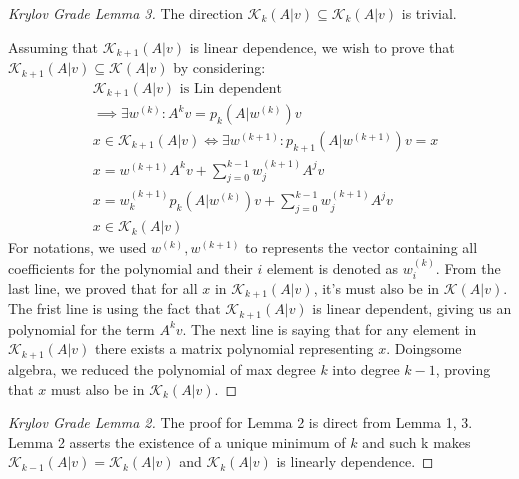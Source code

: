 \documentclass[]{article}
\theoremstyle{definition}
\begin{document}
            \begin{proof}[Krylov Grade Lemma 3]
                The direction $\mathcal K_k(A|v) \subseteq \mathcal K_k(A|v)$ is trivial. 
                
                Assuming that $\mathcal K_{k + 1}(A|v)$ is linear dependence, we wish to prove that $\mathcal K_{k + 1}(A|v)\subseteq \mathcal K(A|v)$ by considering: 
                $$
                \begin{aligned}
                    & \mathcal K_{k + 1}(A|v) \text{ is Lin dependent} 
                    \\
                    & \implies \exists w^{(k)}: A^kv  = p_k(A|w^{(k)})v
                    \\
                    & x \in \mathcal K_{k + 1}(A|v)\iff \exists w^{(k + 1)}: p_{k + 1}(A|w^{(k + 1)}) v = x
                    \\
                    & x = w^{(k + 1)} A^kv + \sum_{j = 0}^{k - 1}w^{(k + 1)}_jA^jv
                    \\
                    & x = w^{(k + 1)}_k p_k(A|w^{(k)})v + \sum_{j = 0}^{k - 1}w^{(k + 1)}_jA^jv
                    \\
                    & x \in \mathcal K_k(A|v)
                \end{aligned}
                $$
                For notations, we used $w^{(k)}, w^{(k + 1)}$ to represents the vector containing all coefficients for the polynomial and their $i$ element is denoted as $w^{(k)}_i$. From the last line, we proved that for all $x$ in $\mathcal K_{k + 1}(A|v)$, it's must also be in $\mathcal K(A|v)$. The frist line is using the fact that $\mathcal K_{k + 1}(A|v)$ is linear dependent, giving us an polynomial for the term $A^kv$. The next line is saying that for any element in $\mathcal K_{k + 1}(A|v)$ there exists a matrix polynomial representing $x$. Doingsome algebra, we reduced the polynomial of max degree $k$ into degree $k - 1$, proving that $x$ must also be in $\mathcal K_k(A|v)$.
            \end{proof}
            \begin{proof}[Krylov Grade Lemma 2]
                The proof for Lemma 2 is direct from Lemma 1, 3. Lemma 2 asserts the existence of a unique minimum of $k$ and such k makes $\mathcal K_{k - 1}(A|v) = \mathcal K_k(A|v)$ and $\mathcal K_k(A|v)$ is linearly dependence. 
            \end{proof}
\end{document}
